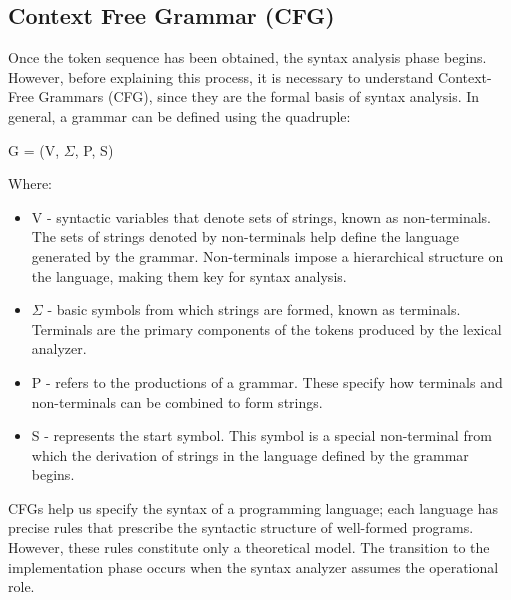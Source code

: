 \documentclass[letterpaper,12pt,oneside]{article}
\begin{document}
    \subsection{Context Free Grammar (CFG)}
    Once the token sequence has been obtained, the syntax analysis phase begins. However, before explaining this process, it is necessary to understand Context-Free Grammars (CFG), since they are the formal basis of syntax analysis. In general, a grammar can be defined using the quadruple:
    \begin{center}
        G = (V, $\Sigma$, P, S)
    \end{center}
    Where:
    \begin{itemize}
        \item V - syntactic variables that denote sets of strings, known as non-terminals. The sets of strings denoted by non-terminals help define the language generated by the grammar. Non-terminals impose a hierarchical structure on the language, making them key for syntax analysis.
        \item $\Sigma$ - basic symbols from which strings are formed, known as terminals. Terminals are the primary components of the tokens produced by the lexical analyzer.
        \item P - refers to the productions of a grammar. These specify how terminals and non-terminals can be combined to form strings.
        \item S - represents the start symbol. This symbol is a special non-terminal from which the derivation of strings in the language defined by the grammar begins.
    \end{itemize}
    CFGs help us specify the syntax of a programming language; each language has precise rules that prescribe the syntactic structure of well-formed programs. However, these rules constitute only a theoretical model. The transition to the implementation phase occurs when the syntax analyzer assumes the operational role.\cite{aho2008compiladores}
    
\end{document}
